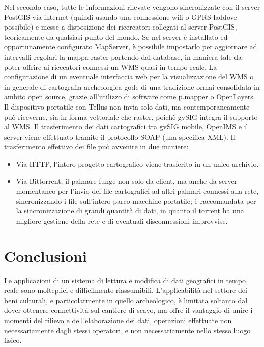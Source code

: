 	Nel secondo caso, tutte le informazioni rilevate vengono sincronizzate con il server PostGIS via internet (quindi usando una connessione wifi o GPRS laddove possibile) e messe a disposizione dei ricercatori collegati al server PostGIS, teoricamente da qualsiasi punto del mondo.  Se nel server è installato ed opportunamente configurato MapServer, è possibile impostarlo per aggiornare ad intervalli regolari la mappa raster partendo dal database, in maniera tale da poter offrire ai ricecatori connessi un WMS quasi in tempo reale. La configurazione di un eventuale interfaccia web per la visualizzazione del WMS o in generale di cartografia archeologica gode di una tradizione ormai consolidata in ambito open source, grazie all'utilizzo di software come p.mapper o OpenLayers.\\


	Il dispositivo portatile con Tellus non invia solo dati, ma contemporaneamente può riceverne, sia in forma vettoriale che raster, poichè gvSIG integra il supporto al WMS. Il trasferimento dei dati cartografici tra gvSIG mobile, OpenIMS e il server viene effettuato tramite il protocollo SOAP (una specifica XML). Il trasferimento effettivo dei file può avvenire in due maniere:
	
	\begin{itemize}
		\item Via HTTP, l'intero progetto cartografico viene trasferito in un unico archivio.
		\item Via Bittorrent, il palmare funge non solo da client, ma anche da server momentaneo per l'invio dei file cartografici ad altri palmari connessi alla rete, sincronizzando i file sull'intero parco macchine portatile; è raccomandata per la sincronizzazione di grandi quantità di dati, in quanto il torrent ha una migliore gestione della rete e di eventuali disconnessioni improvvise.
	\end{itemize}

\section{Conclusioni}
	Le applicazioni di un sistema di lettura e modifica di dati geografici in tempo reale sono molteplici e difficilmente riassumibili. L'applicabilità nel settore dei beni culturali, e particolarmente in quello archeologico, è limitata soltanto dal dover ottenere connettività sul cantiere di scavo, ma offre il vantaggio di unire i momenti del rilievo e dell'elaborazione dei dati, operazioni effettuate non necessariamente dagli stessi operatori, e non necessariamente nello stesso luogo fisico.

